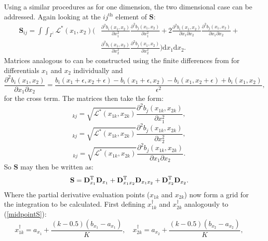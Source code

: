 Using a similar procedures as for one dimension, the two dimensional case can be addressed. Again looking at the $ij^\text{th}$ element of $\mathbf{S}$:
\begin{align*}
\mathbf{S}_{ij}= \int\int_{\Gamma^\prime} \mathcal{L}^*(x_1,x_2) \Bigg ( & \frac{\partial^2 b_i(x_1,x_2)}{\partial x_1^2}\frac{\partial^2 b_j(x_1,x_2)}{\partial x_1^2}+2\frac{\partial^2 b_i(x_1,x_2)}{\partial x_1 \partial x_2}\frac{\partial^2 b_j(x_1,x_2)}{\partial x_1 \partial x_2}+ \\ 
& \frac{\partial^2 b_i(x_1,x_2)}{\partial x_2^2}\frac{\partial^2 b_j(x_1,x_2)}{\partial x_2^2} \Bigg )  \text{d}x_1\text{d}x_2.
\end{align*}
Matrices analogous to  can be constructed using the finite differences from  for differentials $x_1$ and $x_2$ individually and
\begin{equation*}
\frac{\partial^2 b_i(x_1,x_2)}{\partial x_1 \partial x_2} = \frac{ b_i(x_1+\epsilon,x_2+\epsilon) - b_i(x_1+\epsilon,x_2) - b_i(x_1,x_2+\epsilon) + b_i(x_1,x_2)}{\epsilon^2},
\end{equation*}
for the cross term. The matrices then take the form:
\begin{equation*}
[\mathbf{D}_{x_1}]_{kj}=\sqrt{\mathcal{L}^*(x_{1k},x_{2k})} \frac{\partial^2 b_j(x_{1k},x_{2k})}{\partial x_1^2},
\end{equation*}
\begin{equation*}
[\mathbf{D}_{x_2}]_{kj}=\sqrt{\mathcal{L}^*(x_{1k},x_{2k})} \frac{\partial^2 b_j(x_{1k},x_{2k})}{\partial x_2^2},
\end{equation*}
\begin{equation*}
[\mathbf{D}_{x_1 x_2}]_{kj}=\sqrt{\mathcal{L}^*(x_{1k},x_{2k})} \frac{\partial^2 b_j(x_{1k},x_{2k})}{\partial x_1 \partial x_2}.
\end{equation*}
So $\mathbf{S}$ may then be written as:
\begin{equation*}
\mathbf{S}=\mathbf{D}_{x_1}^{\text{T}}\mathbf{D}_{x_1} + \mathbf{D}_{x_1 x_2}^{\text{T}}\mathbf{D}_{x_1 x_2} + \mathbf{D}_{x_2}^{\text{T}}\mathbf{D}_{x_2}.
\end{equation*}
Where the partial derivative evaluation points ($x_{1k}$ and $x_{2k}$) now form a grid for the integration to be calculated. First defining $x^\dagger_{1k}$ and $x^\dagger_{2k}$ analogously to (\ref{midpointS}):
\begin{equation*}
x^\dagger_{1k}=a_{x_1}+\frac{(k-0.5)(b_{x_1}-a_{x_1})}{K},\quad
x^\dagger_{2k}=a_{x_2}+\frac{(k-0.5)(b_{x_2}-a_{x_2})}{K},
\end{equation*}
